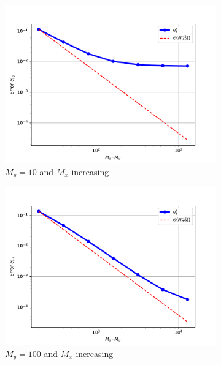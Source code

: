 \begin{figure}[t]
\begin{subfigure}{.5\textwidth}
  \centering
  \includegraphics[width=\linewidth]{plots/task3bMy20.pdf}
  \caption{$M_y = 10$ and $M_x$ increasing}
\end{subfigure}
\begin{subfigure}{.5\textwidth}
  \centering
  \includegraphics[width=\linewidth]{plots/task3bMy50.pdf}
  \caption{$M_y = 100$ and $M_x$ increasing}
\end{subfigure}
\begin{subfigure}{.5\textwidth}
  \centering

\end{subfigure}
\end{figure}
